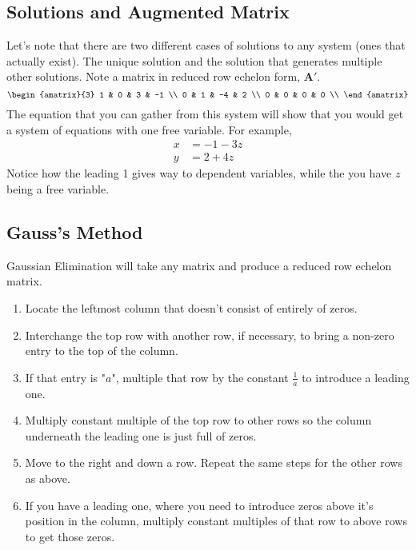 \subsection{Solutions and Augmented Matrix}
Let's note that there are two different cases of solutions to any system (ones that actually exist). The unique solution and the solution that generates multiple other solutions. Note a matrix in reduced row echelon form, $\mathbf{A'}$. 
\begin{equation*}
	\begin{amatrix}{3} 
		1 & 0 & 3 & -1 \\ 
		0 & 1 & -4 & 2 \\ 
		0 & 0 & 0 & 0 \\ 	
	\end{amatrix}
\end{equation*}
The equation that you can gather from this system will show that you would get a system of equations with one free variable. For example, 
\begin{align*}
	x &= -1-3z \\
	y &= 2 + 4z    
\end{align*}
Notice how the leading 1 gives way to dependent variables, while the you have $z$ being a free variable. 

\subsection{Gauss's Method}
Gaussian Elimination will take any matrix and produce a reduced row echelon matrix. 
\begin{enumerate}
	\item Locate the leftmost column that doesn't consist of entirely of zeros. 
	\item Interchange the top row with another row, if necessary, to bring a non-zero entry to the top of the column.
	\item If that entry is "$a$", multiple that row by the constant $\frac{1}{a}$ to introduce a leading one. 
	\item Multiply constant multiple of the top row to other rows so the column underneath the leading one is just full of zeros. 
	\item Move to the right and down a row. Repeat the same steps for the other rows as above. 
	\item If you have a leading one, where you need to introduce zeros above it's position in the column, multiply constant multiples of that row to above rows to get those zeros.  
\end{enumerate}

